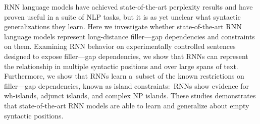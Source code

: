 RNN language models have achieved state-of-the-art perplexity results and have proven useful in a suite of NLP tasks, but it is as yet unclear what syntactic generalizations they learn. Here we investigate whether state-of-the-art RNN language models represent long-distance filler---gap dependencies and constraints on them. Examining RNN behavior on experimentally controlled sentences designed to expose filler---gap dependencies, we show that RNNs can represent the relationship in multiple syntactic positions and over large spans of text. Furthermore, we show that RNNs learn a subset of the known restrictions on filler---gap dependencies, known as island constraints: RNNs show evidence for wh-islands, adjunct islands, and complex NP islands. These studies demonstrates that state-of-the-art RNN models are able to learn and generalize about empty syntactic positions.
